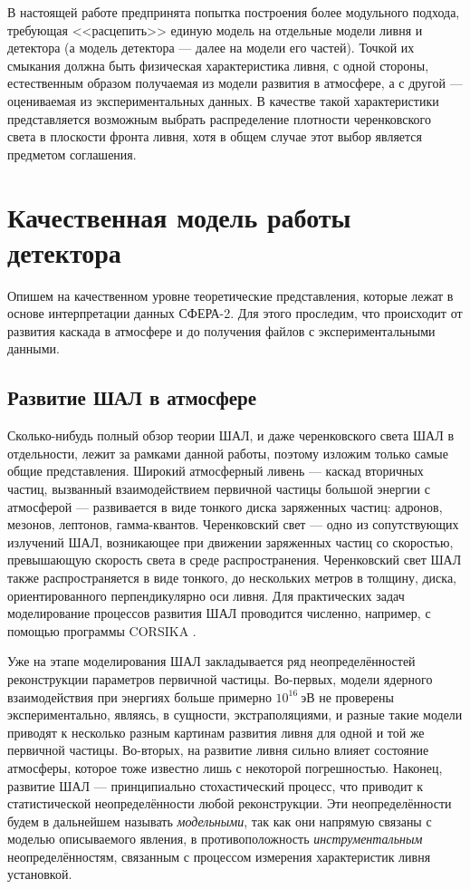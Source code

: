 В настоящей работе предпринята попытка построения более модульного подхода, требующая <<расцепить>> единую модель на отдельные модели ливня и детектора (а модель детектора --- далее на модели его частей). Точкой их смыкания должна быть физическая характеристика ливня, с одной стороны, естественным образом получаемая из модели развития в атмосфере, а с другой --- оцениваемая из экспериментальных данных. В качестве такой характеристики представляется возможным выбрать распределение плотности черенковского света в плоскости фронта ливня, хотя в общем случае этот выбор является предметом соглашения.


\section{Качественная модель работы детектора}
\label{sec:sphere-2-model}

Опишем на качественном уровне теоретические представления, которые лежат в основе интерпретации данных СФЕРА-2. Для этого проследим, что происходит от развития каскада в атмосфере и до получения файлов с экспериментальными данными.

\subsection{Развитие ШАЛ в атмосфере}

Сколько-нибудь полный обзор теории ШАЛ, и даже черенковского света ШАЛ в отдельности, лежит за рамками данной работы, поэтому изложим только самые общие представления. Широкий атмосферный ливень --- каскад вторичных частиц, вызванный взаимодействием первичной частицы большой энергии с атмосферой --- развивается в виде тонкого диска заряженных частиц: адронов, мезонов, лептонов, гамма-квантов. Черенковский свет --- одно из сопутствующих излучений ШАЛ, возникающее при движении заряженных частиц со скоростью, превышающую скорость света в среде распространения. Черенковский свет ШАЛ также распространяется в виде тонкого, до нескольких метров в толщину, диска, ориентированного перпендикулярно оси ливня. Для практических задач моделирование процессов развития ШАЛ проводится численно, например, с помощью программы CORSIKA \cite{CORSIKA-report}.

Уже на этапе моделирования ШАЛ закладывается ряд неопределённостей реконструкции параметров первичной частицы. Во-первых, модели ядерного взаимодействия при энергиях больше примерно $10^{16}~\text{эВ}$ не проверены экспериментально, являясь, в сущности, экстраполяциями, и разные такие модели приводят к несколько разным картинам развития ливня для одной и той же первичной частицы. Во-вторых, на развитие ливня сильно влияет состояние атмосферы, которое тоже известно лишь с некоторой погрешностью. Наконец, развитие ШАЛ --- принципиально стохастический процесс, что приводит к статистической неопределённости любой реконструкции. Эти неопределённости будем в дальнейшем называть \textit{модельными}, так как они напрямую связаны с моделью описываемого явления, в противоположность \textit{инструментальным} неопределённостям, связанным с процессом измерения характеристик ливня установкой.

